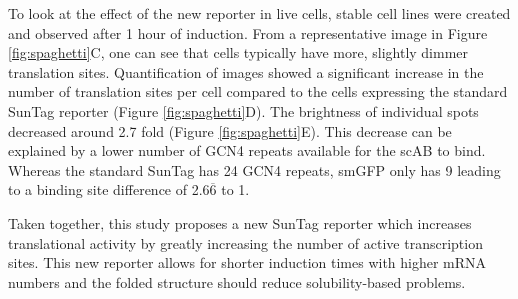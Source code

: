 To look at the effect of the new reporter in live cells, stable cell lines were created and observed after 1 hour of induction.
From a representative image in Figure \ref{fig:spaghetti}C, one can see that cells typically have more, slightly dimmer translation sites.
Quantification of images showed a significant increase in the number of translation sites per cell compared to the cells expressing the standard SunTag reporter (Figure \ref{fig:spaghetti}D).
The brightness of individual spots decreased around 2.7 fold (Figure \ref{fig:spaghetti}E).
This decrease can be explained by a lower number of GCN4 repeats available for the scAB to bind.
Whereas the standard SunTag has 24 GCN4 repeats, smGFP only has 9 leading to a binding site difference of 2.6$\overline{\mbox{6}}$ to 1.

Taken together, this study proposes a new SunTag reporter which increases translational activity by greatly increasing the number of active transcription sites.
This new reporter allows for shorter induction times with higher mRNA numbers and the folded structure should reduce solubility-based problems.

